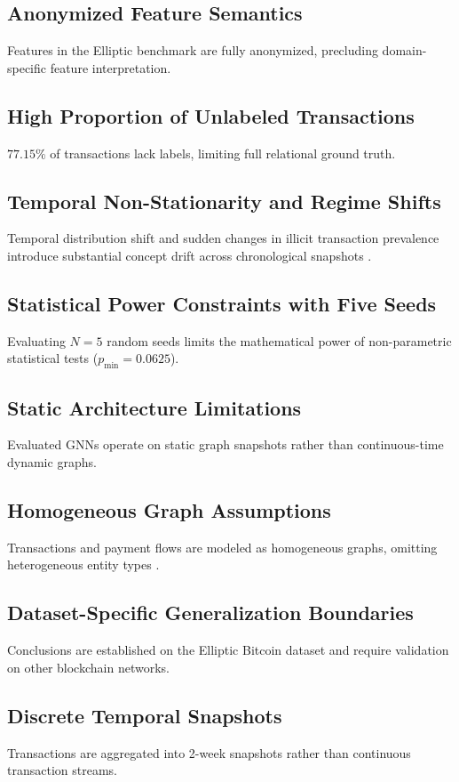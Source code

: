 \documentclass[conference]{IEEEtran}
\begin{document}
\subsection{Anonymized Feature Semantics}
Features in the Elliptic benchmark are fully anonymized, precluding domain-specific feature interpretation.

\subsection{High Proportion of Unlabeled Transactions}
$77.15\%$ of transactions lack labels, limiting full relational ground truth.

\subsection{Temporal Non-Stationarity and Regime Shifts}
Temporal distribution shift and sudden changes in illicit transaction prevalence introduce substantial concept drift across chronological snapshots \cite{gama2014survey, quinonero2009dataset}.

\subsection{Statistical Power Constraints with Five Seeds}
Evaluating $N=5$ random seeds limits the mathematical power of non-parametric statistical tests ($p_{\min} = 0.0625$).

\subsection{Static Architecture Limitations}
Evaluated GNNs operate on static graph snapshots rather than continuous-time dynamic graphs.

\subsection{Homogeneous Graph Assumptions}
Transactions and payment flows are modeled as homogeneous graphs, omitting heterogeneous entity types \cite{arp2022dos}.

\subsection{Dataset-Specific Generalization Boundaries}
Conclusions are established on the Elliptic Bitcoin dataset and require validation on other blockchain networks.

\subsection{Discrete Temporal Snapshots}
Transactions are aggregated into 2-week snapshots rather than continuous transaction streams.
\end{document}

